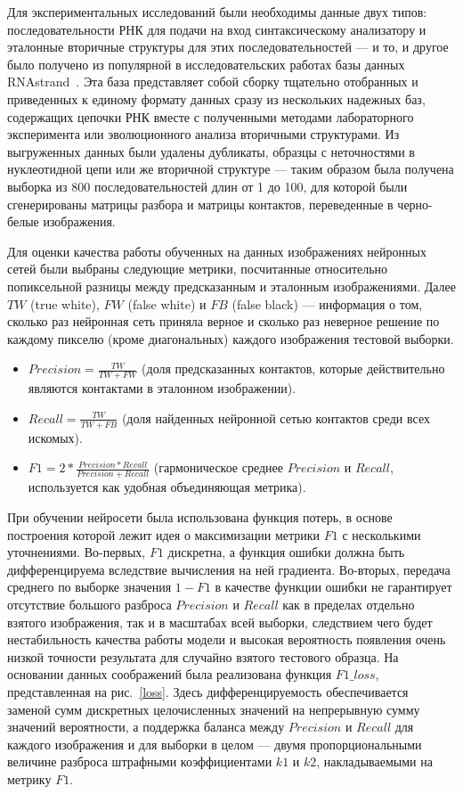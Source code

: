Для экспериментальных исследований были необходимы данные двух типов: последовательности РНК для подачи на вход синтаксическому анализатору и эталонные вторичные структуры для этих последовательностей --- и то, и другое было получено из популярной в исследовательских работах базы данных RNAstrand~\cite{andronescu2008rna}. Эта база представляет собой сборку тщательно отобранных и приведенных к единому формату данных сразу из нескольких надежных баз, содержащих цепочки РНК вместе с полученными методами лабораторного эксперимента или эволюционного анализа вторичными структурами. Из выгруженных данных были удалены дубликаты, образцы с неточностями в нуклеотидной цепи или же вторичной структуре --- таким образом была получена выборка из 800 последовательностей длин от 1 до 100, для которой были сгенерированы матрицы разбора и матрицы контактов, переведенные в черно-белые изображения.

Для оценки качества работы обученных на данных изображениях нейронных сетей были выбраны следующие метрики, посчитанные относительно попиксельной разницы между предсказанным и эталонным изображениями. Далее $TW$ (true white), $FW$ (false white) и $FB$ (false black) --- информация о том, сколько раз нейронная сеть приняла верное и сколько раз неверное решение по каждому пикселю (кроме диагональных) каждого изображения тестовой выборки.
\begin{itemize} 
    \item $Precision = \frac{TW}{TW + FW}$ (доля предсказанных контактов, которые действительно являются контактами в эталонном изображении).
    \item $Recall = \frac{TW}{TW + FB}$ (доля найденных нейронной сетью контактов среди всех искомых).
    \item $F1 = 2 * \frac{Precision * Recall}{Precision + Recall}$ (гармоническое среднее $Precision$ и $Recall$, используется как удобная объединяющая метрика).
\end{itemize}

При обучении нейросети была использована функция потерь, в основе построения которой лежит идея о максимизации метрики $F1$ с несколькими уточнениями. Во-первых, $F1$ дискретна, а функция ошибки должна быть дифференцируема вследствие вычисления на ней градиента. Во-вторых, передача среднего по выборке значения $1 - F1$ в качестве функции ошибки не гарантирует отсутствие большого разброса $Precision$ и $Recall$ как в пределах отдельно взятого изображения, так и в масштабах всей выборки, следствием чего будет нестабильность качества работы модели и высокая вероятность появления очень низкой точности результата для случайно взятого тестового образца. На основании данных соображений была реализована функция $F1\_loss$, представленная на рис.~\ref{loss}. Здесь дифференцируемость обеспечивается заменой сумм дискретных целочисленных значений на непрерывную сумму значений вероятности, а поддержка баланса между $Precision$ и $Recall$ для каждого изображения и для выборки в целом --- двумя пропорциональными величине разброса штрафными коэффициентами $k1$ и $k2$, накладываемыми на метрику $F1$.

